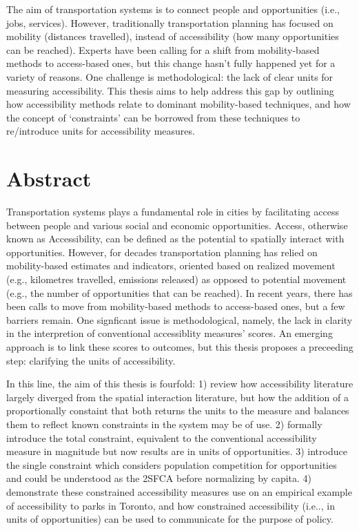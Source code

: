 \documentclass[
11pt, %
oneside, %
english, %
singlespacing, %
]{macthesis} %
\def\blankpage{%
      \clearpage%
      \thispagestyle{empty}%
      \addtocounter{page}{-1}%
      \null%
      \clearpage}
\begin{document}
  The aim of transportation systems is to connect people and opportunities (i.e., jobs, services). However, traditionally transportation planning has focused on mobility (distances travelled), instead of accessibility (how many opportunities can be reached). Experts have been calling for a shift from mobility-based methods to access-based ones, but this change hasn't fully happened yet for a variety of reasons. One challenge is methodological: the lack of clear units for measuring accessibility. This thesis aims to help address this gap by outlining how accessibility methods relate to dominant mobility-based techniques, and how the concept of `constraints' can be borrowed from these techniques to re/introduce units for accessibility measures.
\blankpage
\clearpage



\section*{\Huge Abstract}
\addchaptertocentry{\abstractname}
Transportation systems plays a fundamental role in cities by facilitating access between people and various social and economic opportunities. Access, otherwise known as Accessibility, can be defined as the potential to spatially interact with opportunities. However, for decades transportation planning has relied on mobility-based estimates and indicators, oriented based on realized movement (e.g., kilometres travelled, emissions released) as opposed to potential movement (e.g., the number of opportunities that can be reached). In recent years, there has been calls to move from mobility-based methods to access-based ones, but a few barriers remain. One signficant issue is methodological, namely, the lack in clarity in the interpretion of conventional accessiblity measures' scores. An emerging approach is to link these scores to outcomes, but this thesis proposes a preceeding step: clarifying the units of accessibility.

In this line, the aim of this thesis is fourfold: 1) review how accessibility literature largely diverged from the spatial interaction literature, but how the addition of a proportionally constaint that both returns the units to the measure and balances them to reflect known constraints in the system may be of use. 2) formally introduce the total constraint, equivalent to the conventional accessibility measure in magnitude but now results are in units of opportunities. 3) introduce the single constraint which considers population competition for opportunities and could be understood as the 2SFCA before normalizing by capita. 4) demonstrate these constrained accessibility measures use on an empirical example of accessibility to parks in Toronto, and how constrained accessibility (i.e.., in units of opportunities) can be used to communicate for the purpose of policy.
\blankpage
\clearpage
\end{document}
